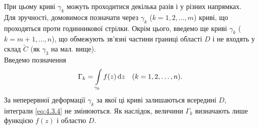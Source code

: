 При цьому криві $\gamma_k$ можуть проходитися декілька разів і у різних напрямках. \\

Для зручності, домовимося позначати через $\gamma_k$ ($k = 1, 2, \ldots, m$) криві, що проходяться проти годинникової стрілки. Окрім цього, введемо ще криві $\gamma_k$ ($k = m + 1, \ldots, n$), що обмежують зв'язні частини границі області $D$ і не входять у склад $\widetilde{C}$ (як $\gamma_3$ на мал. вище). \\

Введемо позначення
\begin{equation}
	\label{eq:4.3.4}
	\Gamma_k = \displaystyle\int\limits_{\gamma_k} f(z) \mathop{}\!\mathrm{d} z \quad (k = 1, 2, \ldots, n).
\end{equation}
За неперервної деформації $\gamma_k$ за якої ці криві залишаються всередині $D$, інтеграли \eqref{eq:4.3.4} не змінюються. Як наслідок, величини $\Gamma_k$ визначають лише функцією $f(z)$ і областю $D$. \\

